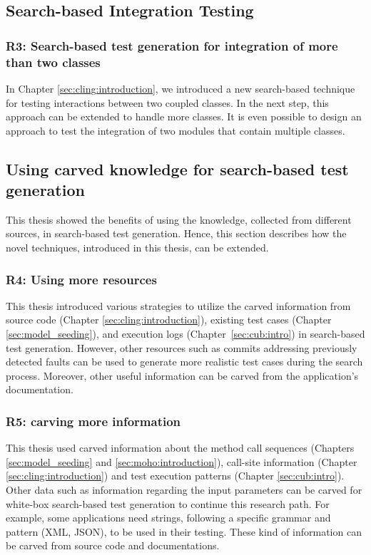 \subsection{Search-based Integration Testing}
\subsubsection{R3: Search-based test generation for integration of more than two classes}
In Chapter \ref{sec:cling:introduction}, we introduced a new search-based technique for testing interactions between two coupled classes. In the next step, this approach can be extended to handle more classes. It is even possible to design an approach to test the integration of two modules that contain multiple classes.

\subsection{Using carved knowledge for search-based test generation}
This thesis showed the benefits of using the knowledge, collected from different sources, in search-based test generation. Hence, this section describes how the novel techniques, introduced in this thesis, can be extended.

\subsubsection{R4: Using more resources}
This thesis introduced various strategies to utilize the carved information from source code (\eg Chapter \ref{sec:cling:introduction}), existing test cases (\eg Chapter \ref{sec:model_seeding}), and execution logs (Chapter~\ref{sec:cub:intro}) in search-based test generation. However, other resources such as commits addressing previously detected faults can be used to generate more realistic test cases during the search process. Moreover, other useful information can be carved from the application's documentation.

\subsubsection{R5: carving more information}
This thesis used carved information about the method call sequences (\eg Chapters \ref{sec:model_seeding} and \ref{sec:moho:introduction}), call-site information (Chapter \ref{sec:cling:introduction}) and test execution patterns (Chapter \ref{sec:cub:intro}). Other data such as information regarding the input parameters can be carved for white-box search-based test generation to continue this research path. For example, some applications need strings, following a specific grammar and pattern (\eg XML, JSON), to be used in their testing. These kind of information can be carved from source code and documentations.